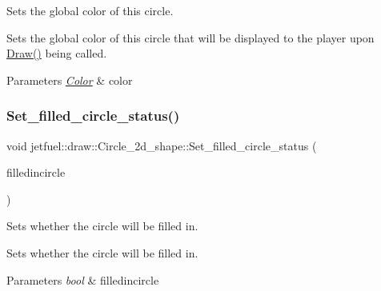 Sets the global color of this circle. 

Sets the global color of this circle that will be displayed to the player upon \hyperlink{classjetfuel_1_1draw_1_1Circle__2d__shape_a8be660f3cd624dc077d9003ee3b37212}{Draw()} being called.


\begin{DoxyParams}{Parameters}
{\em \hyperlink{classjetfuel_1_1draw_1_1Color}{Color}} & color \\
\hline
\end{DoxyParams}
\mbox{\label{classjetfuel_1_1draw_1_1Circle__2d__shape_a027d4640ee52708f5fa853f20ba2f899}} 
\subsubsection{\texorpdfstring{Set\+\_\+filled\+\_\+circle\+\_\+status()}{Set\_filled\_circle\_status()}}
{\footnotesize\ttfamily void jetfuel\+::draw\+::\+Circle\+\_\+2d\+\_\+shape\+::\+Set\+\_\+filled\+\_\+circle\+\_\+status (\begin{DoxyParamCaption}\item[{const bool}]{filledincircle }\end{DoxyParamCaption})\hspace{0.3cm}{\ttfamily [inline]}}



Sets whether the circle will be filled in. 

Sets whether the circle will be filled in.


\begin{DoxyParams}{Parameters}
{\em bool} & filledincircle \\
\hline
\end{DoxyParams}
\mbox{\label{classjetfuel_1_1draw_1_1Circle__2d__shape_a551b38063543823483f560bf3eebcd2c}} 
